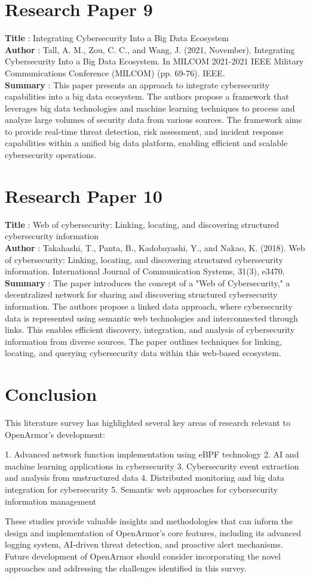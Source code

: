 \newpage
\section{Research Paper 9}
\textbf{Title} : Integrating Cybersecurity Into a Big Data Ecosystem
\\
\textbf{Author} : Tall, A. M., Zou, C. C., and Wang, J. (2021, November). Integrating Cybersecurity Into a Big Data Ecosystem. In MILCOM 2021-2021 IEEE Military Communications Conference (MILCOM) (pp. 69-76). IEEE.
\\
\textbf{Summary} : This paper presents an approach to integrate cybersecurity capabilities into a big data ecosystem. The authors propose a framework that leverages big data technologies and machine learning techniques to process and analyze large volumes of security data from various sources. The framework aims to provide real-time threat detection, risk assessment, and incident response capabilities within a unified big data platform, enabling efficient and scalable cybersecurity operations.

\section{Research Paper 10}
\textbf{Title} : Web of cybersecurity: Linking, locating, and discovering structured cybersecurity information
\\
\textbf{Author} : Takahashi, T., Panta, B., Kadobayashi, Y., and Nakao, K. (2018). Web of cybersecurity: Linking, locating, and discovering structured cybersecurity information. International Journal of Communication Systems, 31(3), e3470.
\\
\textbf{Summary} : The paper introduces the concept of a "Web of Cybersecurity," a decentralized network for sharing and discovering structured cybersecurity information. The authors propose a linked data approach, where cybersecurity data is represented using semantic web technologies and interconnected through links. This enables efficient discovery, integration, and analysis of cybersecurity information from diverse sources. The paper outlines techniques for linking, locating, and querying cybersecurity data within this web-based ecosystem.


\section{Conclusion}
This literature survey has highlighted several key areas of research relevant to OpenArmor's development:

1. Advanced network function implementation using eBPF technology
2. AI and machine learning applications in cybersecurity
3. Cybersecurity event extraction and analysis from unstructured data
4. Distributed monitoring and big data integration for cybersecurity
5. Semantic web approaches for cybersecurity information management

These studies provide valuable insights and methodologies that can inform the design and implementation of OpenArmor's core features, including its advanced logging system, AI-driven threat detection, and proactive alert mechanisms. Future development of OpenArmor should consider incorporating the novel approaches and addressing the challenges identified in this survey.
